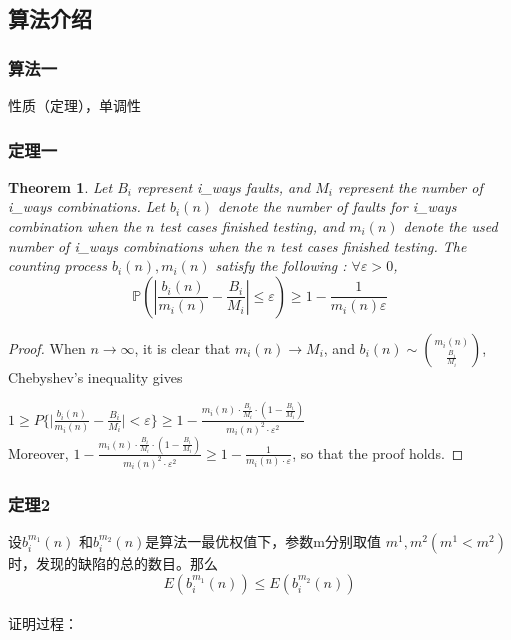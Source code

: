 \documentclass[10pt,journal,letterpaper,compsoc]{IEEEtran}
\newtheorem{thm}{Theorem}[section]
\def\P{{\mathbb P}}
\begin{document}
\begin{CJK}{UTF8}{gkai}
\subsection{ 算法介绍}
    \subsubsection{ 算法一} 性质（定理），单调性
    \subsubsection*{定理一}
    \begin{thm}
Let $B_i$ represent i\_ways faults, and $M_i$ represent the number of i\_ways combinations.
Let $b_i(n)$ denote the number of faults for i\_ways combination when the $n$ test cases finished testing, 
and  $m_i(n)$ denote the used number of i\_ways combinations when the $n$ test cases finished testing.
The counting process $b_i(n),m_i(n)$ satisfy the following :
$\forall\varepsilon>0$,  
\begin{equation}  
\P(|\frac{b_i(n)}{m_i(n)} - \frac{B_i}{M_i}| \le \varepsilon )
        \geq {1-\frac{1}{m_i(n)\varepsilon}}
\end{equation}
\end{thm}

\begin{proof}
When $n\rightarrow \infty$, it is clear that $ m_i(n)\rightarrow M_i $, and $ b_i(n)\sim \binom{m_i(n)}
{\frac{B_i}{M_i}} $, Chebyshev's inequality gives 

$ 1 \geq P \{\vert \frac{b_i(n)}{m_i(n)} - 
\frac{B_i}{M_i}\vert < \varepsilon \}
\geq 1-\frac{m_i(n)\cdot \frac{B_i}{M_i} \cdot  (1-\frac{B_i}{M_i})}{m_i(n)^2\cdot \varepsilon^2} $
\\Moreover,
$1-\frac{m_i(n)\cdot \frac{B_i}{M_i} \cdot  (1-\frac{B_i}{M_i})}{m_i(n)^2\cdot \varepsilon^2}
\geq 1-\frac{1}{m_i(n) \cdot \varepsilon} $, so that the proof holds. 
\end{proof}

    \subsubsection*{定理2}
设$b_i^{m_1}(n)$ 和$b_i^{m_2}(n)$是算法一最优权值下，参数m分别取值
$m^1,m^2(m^1<m^2)$时，发现的缺陷的总的数目。那么
\begin{equation}  
E(b_i^{m_1}(n)) \leq E(b_i^{m_2}(n))
\end{equation}
\\证明过程：


\end{CJK}
\end{document}
